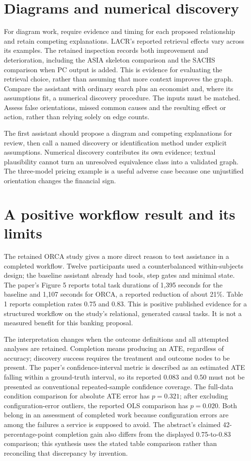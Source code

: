 \section{Diagrams and numerical discovery}
For diagram work, require evidence and timing for each proposed relationship
and retain competing explanations. LACR's reported retrieval effects vary
across its examples. The retained inspection records both improvement and
deterioration, including the ASIA skeleton comparison and the SACHS
comparison when PC output is added. This is evidence for evaluating the
retrieval choice, rather than assuming that more context improves the graph.
\citep{v12_la_2402_15301}
Compare the assistant with ordinary search plus an economist and, where
its assumptions fit, a numerical discovery procedure. The inputs must
be matched. Assess false orientations, missed common causes and the
resulting effect or action, rather than relying solely on edge counts.

The first assistant should propose a diagram and competing explanations
for review, then call a named discovery or identification method under
explicit assumptions. Numerical discovery contributes its own evidence;
textual plausibility cannot turn an unresolved equivalence class into
a validated graph. The three-model pricing example is a useful adverse
case because one unjustified orientation changes the financial sign.

\section{A positive workflow result and its limits}
The retained ORCA study gives a more direct reason to test assistance in a
completed workflow. Twelve participants used a counterbalanced within-subjects
design; the baseline assistant already had tools, step gates and minimal
state. The paper's Figure 5 reports total task durations of 1,395 seconds
for the baseline and 1,107 seconds for ORCA, a reported reduction of about
21\%. Table 1 reports completion rates 0.75 and 0.83. This is positive
published evidence for a structured workflow on the study's relational,
generated causal tasks. It is not a measured benefit for this banking
proposal. \citep[pp.~3--5]{exec13_census_orca}

The interpretation changes when the outcome definitions and all attempted
analyses are retained. Completion means producing an ATE, regardless of
accuracy; discovery success requires the treatment and outcome nodes to be
present. The paper's confidence-interval metric is described as an estimated
ATE falling within a ground-truth interval, so its reported 0.083 and 0.50
must not be presented as conventional repeated-sample confidence coverage.
The full-data condition comparison for absolute ATE error has $p=0.321$;
after excluding configuration-error outliers, the reported OLS comparison
has $p=0.020$. Both belong in an assessment of completed work because
configuration errors are among the failures a service is supposed to avoid.
The abstract's claimed 42-percentage-point completion gain also differs
from the displayed 0.75-to-0.83 comparison; this synthesis uses the stated
table comparison rather than reconciling that discrepancy by invention.
\citep[pp.~1, 5, 17--18]{exec13_census_orca}

